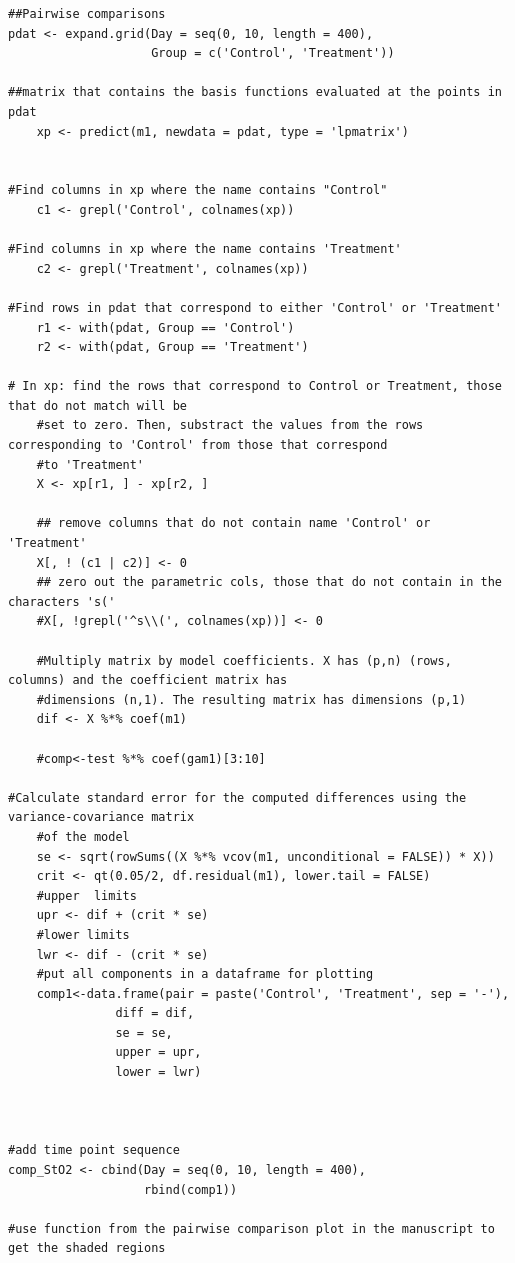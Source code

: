 \documentclass[Royal,times,sagev]{sagej}
\begin{document}
\begin{verbatim}
##Pairwise comparisons
pdat <- expand.grid(Day = seq(0, 10, length = 400),
                    Group = c('Control', 'Treatment'))

##matrix that contains the basis functions evaluated at the points in pdat
    xp <- predict(m1, newdata = pdat, type = 'lpmatrix')

    
#Find columns in xp where the name contains "Control"
    c1 <- grepl('Control', colnames(xp))

#Find columns in xp where the name contains 'Treatment'
    c2 <- grepl('Treatment', colnames(xp))

#Find rows in pdat that correspond to either 'Control' or 'Treatment'
    r1 <- with(pdat, Group == 'Control')
    r2 <- with(pdat, Group == 'Treatment')

# In xp: find the rows that correspond to Control or Treatment, those that do not match will be
    #set to zero. Then, substract the values from the rows corresponding to 'Control' from those that correspond
    #to 'Treatment'
    X <- xp[r1, ] - xp[r2, ]

    ## remove columns that do not contain name 'Control' or 'Treatment'
    X[, ! (c1 | c2)] <- 0
    ## zero out the parametric cols, those that do not contain in the characters 's('
    #X[, !grepl('^s\\(', colnames(xp))] <- 0

    #Multiply matrix by model coefficients. X has (p,n) (rows, columns) and the coefficient matrix has
    #dimensions (n,1). The resulting matrix has dimensions (p,1)
    dif <- X %*% coef(m1)

    #comp<-test %*% coef(gam1)[3:10]

#Calculate standard error for the computed differences using the variance-covariance matrix
    #of the model
    se <- sqrt(rowSums((X %*% vcov(m1, unconditional = FALSE)) * X))
    crit <- qt(0.05/2, df.residual(m1), lower.tail = FALSE)
    #upper  limits
    upr <- dif + (crit * se)
    #lower limits
    lwr <- dif - (crit * se)
    #put all components in a dataframe for plotting
    comp1<-data.frame(pair = paste('Control', 'Treatment', sep = '-'),
               diff = dif,
               se = se,
               upper = upr,
               lower = lwr)



#add time point sequence
comp_StO2 <- cbind(Day = seq(0, 10, length = 400),
                   rbind(comp1))

#use function from the pairwise comparison plot in the manuscript to get the shaded regions
    

\end{verbatim}
\end{document}
